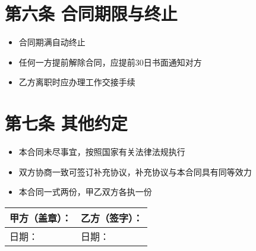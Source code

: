 \documentclass[UTF8]{ctexart}
\begin{document}
\section*{第六条 合同期限与终止}
\begin{itemize}
    \item 合同期满自动终止
    \item 任何一方提前解除合同，应提前30日书面通知对方
    \item 乙方离职时应办理工作交接手续
\end{itemize}

\section*{第七条 其他约定}
\begin{itemize}
    \item 本合同未尽事宜，按照国家有关法律法规执行
    \item 双方协商一致可签订补充协议，补充协议与本合同具有同等效力
    \item 本合同一式两份，甲乙双方各执一份
\end{itemize}

\vspace{2cm}

\begin{tabular}{p{}p{}}
甲方（盖章）： & 乙方（签字）： \\
\hline
日期：\underline{\hspace{3cm}} & 日期：\underline{\hspace{3cm}} \\
\end{tabular}
\end{document}
